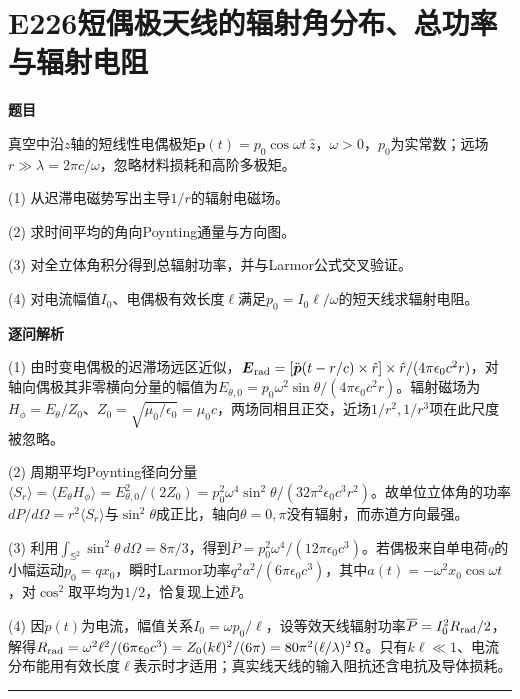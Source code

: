 \documentclass[UTF8,a4paper,11pt,oneside,openany]{ctexbook}
\begin{document}
\section*{E226\quad 短偶极天线的辐射角分布、总功率与辐射电阻}
\textbf{题目}\par
真空中沿$z$轴的短线性电偶极矩$\boldsymbol p(t)=p_0\cos\omega t\,\hat z$，$\omega>0$，$p_0$为实常数；远场$r\gg\lambda=2\pi c/\omega$，忽略材料损耗和高阶多极矩。
\par\smallskip\noindent (1) 从迟滞电磁势写出主导$1/r$的辐射电磁场。
\par\smallskip\noindent (2) 求时间平均的角向Poynting通量与方向图。
\par\smallskip\noindent (3) 对全立体角积分得到总辐射功率，并与Larmor公式交叉验证。
\par\smallskip\noindent (4) 对电流幅值$I_0$、电偶极有效长度$\ell$满足$p_0=I_0\ell/\omega$的短天线求辐射电阻。
\par\medskip\textbf{逐问解析}\par
\par\smallskip\noindent (1) 由时变电偶极的迟滞场远区近似，$\boldsymbol E_{\rm rad}=[\ddot{\boldsymbol p}(t-r/c)\times\hat r]\times\hat r/(4\pi\epsilon_0c^2r)$，对轴向偶极其非零横向分量的幅值为$E_{\theta,0}=p_0\omega^2\sin\theta/(4\pi\epsilon_0c^2r)$。辐射磁场为$H_\phi=E_\theta/Z_0$、$Z_0=\sqrt{\mu_0/\epsilon_0}=\mu_0c$，两场同相且正交，近场$1/r^2,1/r^3$项在此尺度被忽略。
\par\smallskip\noindent (2) 周期平均Poynting径向分量$\langle S_r\rangle=\langle E_\theta H_\phi\rangle=E_{\theta,0}^2/(2Z_0)=p_0^2\omega^4\sin^2\theta/(32\pi^2\epsilon_0c^3r^2)$。故单位立体角的功率$dP/d\Omega=r^2\langle S_r\rangle$与$\sin^2\theta$成正比，轴向$\theta=0,\pi$没有辐射，而赤道方向最强。
\par\smallskip\noindent (3) 利用$\int_{\mathbb S^2}\sin^2\theta\,d\Omega=8\pi/3$，得到$\overline P=p_0^2\omega^4/(12\pi\epsilon_0c^3)$。若偶极来自单电荷$q$的小幅运动$p_0=qx_0$，瞬时Larmor功率$q^2a^2/(6\pi\epsilon_0c^3)$，其中$a(t)=-\omega^2x_0\cos\omega t$，对$\cos^2$取平均为$1/2$，恰复现上述$\overline P$。
\par\smallskip\noindent (4) 因$\dot p(t)$为电流，幅值关系$I_0=\omega p_0/\ell$，设等效天线辐射功率$\overline P=I_0^2R_{\rm rad}/2$，解得$R_{\rm rad}=\omega^2\ell^2/(6\pi\epsilon_0c^3)=Z_0(k\ell)^2/(6\pi)=80\pi^2(\ell/\lambda)^2\,\Omega$。只有$k\ell\ll1$、电流分布能用有效长度$\ell$表示时才适用；真实线天线的输入阻抗还含电抗及导体损耗。
\par\medskip\hrule\medskip
\end{document}
